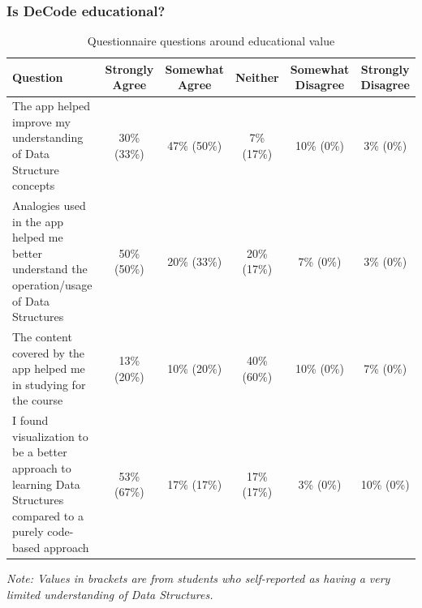 \documentclass[10pt]{article}
\begin{document}
\subsubsection{Is DeCode educational?}
\begin{table}[]
  \begin{tabulary}{\linewidth}{|L|C|C|C|C|C|}
  \hline
  \textbf{Question}                                                                                                  & \textbf{Strongly Agree} & \textbf{Somewhat Agree} & \textbf{Neither} & \textbf{Somewhat Disagree} & \textbf{Strongly Disagree} \\ \hline
  The app helped improve my understanding of Data Structure concepts                                                 & 30\% (33\%)             & 47\% (50\%)             & 7\% (17\%)       & 10\% (0\%)                 & 3\% (0\%)                  \\ \hline
  Analogies used in the app helped me better understand the operation/usage of Data Structures                       & 50\% (50\%)             & 20\% (33\%)             & 20\% (17\%)      & 7\% (0\%)                  & 3\% (0\%)                  \\ \hline
  The content covered by the app helped me in studying for the course                                                & 13\% (20\%)             & 10\% (20\%)             & 40\% (60\%)      & 10\% (0\%)                 & 7\% (0\%)                  \\ \hline
  I found visualization to be a better approach to learning Data Structures compared to a purely code-based approach & 53\% (67\%)             & 17\% (17\%)             & 17\% (17\%)      & 3\% (0\%)                  & 10\% (0\%)                 \\ \hline
  \end{tabulary}
  \emph{Note: Values in brackets are from students who self-reported as having a very limited understanding of Data Structures.}
  \caption{Questionnaire questions around educational value}
  \label{tab:edutable}
\end{table}
\end{document}

